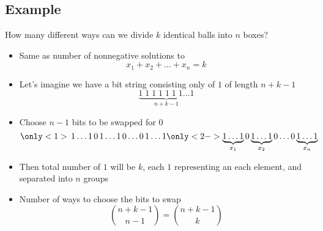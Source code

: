 \documentclass[12pt,t]{beamer}
\newcommand{\bi}{\begin{itemize}}
\newcommand{\ei}{\end{itemize}}
\begin{document}
\subsection{Example}
\begin{frame}
  \vspace{30pt}
  How many different ways can we divide $k$ identical balls into $n$ boxes?
  \bi
    \item Same as number of nonnegative solutions to
      \[
        x_1 + x_2 + \ldots + x_n = k
      \]
    \item Let's imagine we have a bit string consisting only of $1$ of length $n+k-1$
      \[
        \underbrace{1\;1\;1\;1\;1\;1\;1\ldots1}_{n+k-1}
      \]
  \ei
\end{frame}

\begin{frame}
  \vspace{20pt}
  \bi
    \item Choose $n-1$ bits to be swapped for $0$
      \[
        \only<1>{\,1\ldots1\,0\,1\ldots1\,0\ldots0\,1\ldots1}
        \only<2->{\underbrace{1\ldots1}_{x_1}0\underbrace{1\ldots1}_{x_2}0\ldots0\underbrace{1\ldots1}_{x_n}}
      \]
    \item Then total number of $1$ will be $k$, each $1$ representing an each element, and separated into $n$ groups
    \item Number of ways to choose the bits to swap
      \[
        \binom{n+k-1}{n-1} = \binom{n+k-1}{k}
      \]
  \ei
\end{frame}
\end{document}
